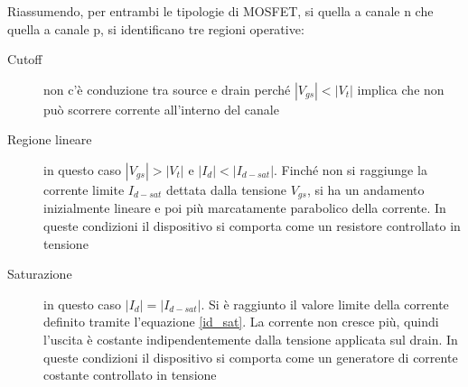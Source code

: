\documentclass[12pt, a4paper]{report}
\begin{document}
Riassumendo, per entrambi le tipologie di MOSFET, si quella a canale n che quella a canale p, si identificano tre regioni operative:
\begin{description}
    \item[Cutoff] non c'è conduzione tra source e drain perché $|V_{gs}| < |V_{t}|$ implica che non può scorrere corrente all'interno del canale
    \item[Regione lineare] in questo caso $|V_{gs}| > |V_{t}|$ e $|I_{d}| < |I_{d-sat}|$. Finché non si raggiunge la corrente limite $I_{d-sat}$ dettata dalla tensione $V_{gs}$, si ha un andamento inizialmente lineare e poi più marcatamente parabolico della corrente. In queste condizioni il dispositivo si comporta come un resistore controllato in tensione
    \item[Saturazione] in questo caso $|I_{d}| = |I_{d-sat}|$. Si è raggiunto il valore limite della corrente definito tramite l'equazione \eqref{id_sat}. La corrente non cresce più, quindi l'uscita è costante indipendentemente dalla tensione applicata sul drain. In queste condizioni il dispositivo si comporta come un generatore di corrente costante controllato in tensione
\end{description}
\end{document}
